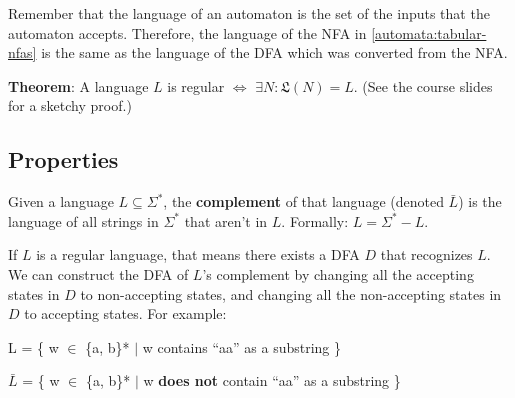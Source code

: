\documentclass[12pt, letterpaper, oneside]{book}
\begin{document}
Remember that the language of an automaton is the set of the inputs that the automaton accepts. Therefore, the language
of the NFA in \ref{automata:tabular-nfas} is the same as the language of the DFA which was converted from the NFA.

\textbf{Theorem}: A language $L$ is regular $\Leftrightarrow$ $\exists N: \mathfrak{L}(N) = L$. (See the course slides
for a sketchy proof.)

\subsection{Properties}

Given a language $L \subseteq \Sigma^*$, the \textbf{complement} of that language (denoted $\bar{L}$) is the language of
all strings in $\Sigma^*$ that aren't in $L$. Formally: $L = \Sigma^* - L$.

If $L$ is a regular language, that means there exists a DFA $D$ that recognizes $L$. We can construct the DFA of $L$'s
complement by changing all the accepting states in $D$ to non-accepting states, and changing all the non-accepting
states in $D$ to accepting states. For example:

L = \{ w $\in$ \{a, b\}* $|$ w contains ``aa'' as a substring \}


$\bar{L}$ = \{ w $\in$ \{a, b\}* $|$ w \textbf{does not} contain ``aa'' as a substring \}

\end{document}

